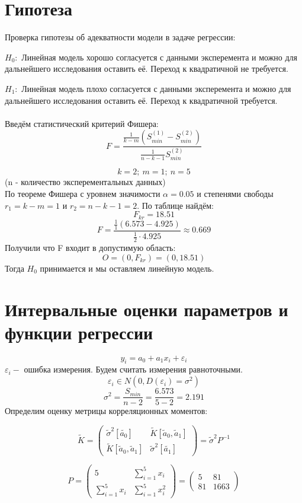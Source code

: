 \documentclass{article}
\begin{document}
\section*{Гипотеза}
Проверка гипотезы об адекватности модели в задаче регрессии:

$H_0:$ Линейная модель хорошо согласуется с данными эксперемента и можно для дальнейшего исследования оставить её. Переход к квадратичной не требуется.

$H_1:$ Линейная модель плохо согласуется с данными эксперемента и можно для дальнейшего исследования оставить её. Переход к квадратичной требуется.
\\ \\
Введём статистический критерий Фишера:
\[F = \frac{\frac{1}{k-m}(S^{(1)}_{min} - S^{(2)}_{min})}{\frac{1}{n-k-1}S^{(2)}_{min}}\]

\[k=2;\ m=1;\ n=5\]
(n - количество эксперементальных данных)
\\
По теореме Фишера с уровнем значимости $\alpha = 0.05$ и степенями свободы $r_1 = k-m = 1$ и $r_2 = n-k-1 = 2$.
По таблице найдём:
\[F_{kr} = 18.51\]
\[F = \frac{\frac{1}{1}(6.573 - 4.925)}{\frac{1}{2}\cdot 4.925} \approx 0.669\]
Получили что F входит в допустимую область:
\[O = (0, F_{kr}) = (0, 18.51)\]
Тогда $H_0$ принимается и мы оставляем линейную модель.

\section*{Интервальные оценки параметров и функции регрессии}

\[y_i = a_0+a_1x_i+\varepsilon_i\]
$\varepsilon_i - $ ошибка измерения. Будем считать измерения равноточными.
\[\varepsilon_i \in N(0, D(\varepsilon_i) = \sigma^2)\]
\[\sigma^2 = \frac{S_{min}}{n-2} = \frac{6.573}{5-2} = 2.191\]
Определим оценку метрицы корреляционных моментов:

\[\tilde{K} = 
\begin{pmatrix}
    \tilde{\sigma}^2[\tilde{a_0}]& \tilde{K}[\tilde{a}_0, \tilde{a}_1]\\
    \tilde{K}[\tilde{a}_0, \tilde{a}_1] & \tilde{\sigma}^2[\tilde{a_1}]
\end{pmatrix}
= \tilde{\sigma}^2P^{-1}\]

\[P = 
\begin{pmatrix}
    5& \sum_{i=1}^{5}x_i\\
    \sum_{i=1}^{5}x_i& \sum_{i=1}^{5}x_i^2
\end{pmatrix}
=
\begin{pmatrix}
    5& 81\\
    81& 1663
\end{pmatrix}\]
\end{document}
